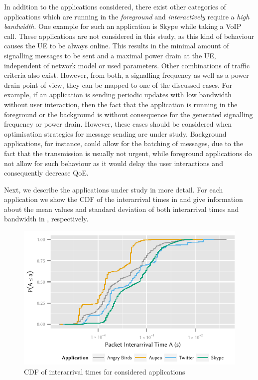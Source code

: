 In addition to the applications considered, there exist other categories of applications which are running in the \emph{foreground} and \emph{interactively} require a \emph{high bandwidth}.
One example for such an application is Skype while taking a \gls{VoIP} call.
These applications are not considered in this study, as this kind of behaviour causes the \gls{UE} to be always online.
This results in the minimal amount of signalling messages to be sent and a maximal power drain at the \gls{UE}, independent of network model or used parameters.
Other combinations of traffic criteria also exist.
However, from both, a signalling frequency as well as a power drain point of view, they can be mapped to one of the discussed cases.
For example, if an application is sending periodic updates with low bandwidth without user interaction, then the fact that the application is running in the foreground or the background is without consequence for the generated signalling frequency or power drain.
However, these cases should be considered when optimisation strategies for message sending are under study.
Background applications, for instance, could allow for the batching of messages, due to the fact that the transmission is usually not urgent, while foreground applications do not allow for such behaviour as it would delay the user interactions and consequently decrease \gls{QoE}.

Next, we describe the applications under study in more detail.
For each application we show the \gls{CDF} of the interarrival times in  and give information about the mean values and standard deviation of both interarrival times and bandwidth in , respectively.

\begin{figure}
\centering
\includegraphics{network/network_traces/numerical_results/figures/interarrival_times}
\caption{CDF of interarrival times for considered applications}\label{fig:network:network_traces:numerical_results:traffic:interarrival_times}
\end{figure}

